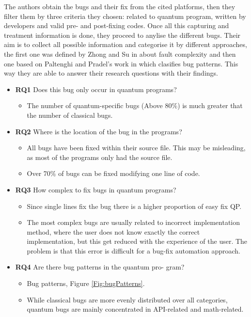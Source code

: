 \begin{itemize}
The authors obtain the bugs and their fix from the cited platforms, then they filter them by three criteria they chosen: related to quantum program, written by developers and valid pre- and post-fixing codes. Once all this capturing and treatment information is done, they proceed to anylise the different bugs. Their aim is to collect all possible information and categorise it by different approaches, the first one was defined by Zhong and Su in \cite{zhong2015empirical} about fault complexity and then one based on Paltenghi and Pradel's work in \cite{paltenghi2022bugs} which clasifies bug patterns. This way they are able to answer their research questions with their findings.

\begin{itemize}
    \item[] \textbf{RQ1} Does this bug only occur in quantum programs?
        \begin{itemize}
            \item The number of quantum-specific bugs (Above 80$\%$) is much greater that the number of classical bugs.
        \end{itemize}
        
    \item[] \textbf{RQ2} Where is the location of the bug in the programs?
        \begin{itemize}
            \item All bugs have been fixed within their source file. This may be misleading, as most of the programs only had the source file.
            \item Over 70$\%$ of bugs can be fixed modifying one line of code.
        \end{itemize}
        
    \item[] \textbf{RQ3} How complex to fix bugs in quantum programs?
        \begin{itemize}
            \item Since single lines fix the bug there is a higher proportion of easy fix QP.
            \item The most complex bugs are usually related to incorrect implementation method, where the user does not know exactly the correct implementation, but this get reduced with the experience of the user. The problem is that this error is difficult for a bug-fix automation approach.
        \end{itemize}
        
    \item[] \textbf{RQ4} Are there bug patterns in the quantum pro- gram?
        \begin{itemize}
            \item Bug patterns, Figure \ref{Fig:bugPatterns}.
            \item While classical bugs are more evenly distributed over all categories, quantum bugs are mainly concentrated in API-related and math-related.
        \end{itemize}
\end{itemize}


\end{itemize}
